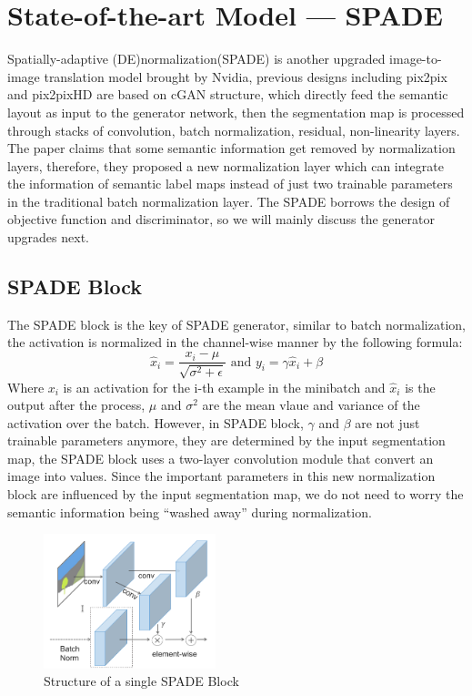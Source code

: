 \section{State-of-the-art Model — SPADE}
Spatially-adaptive (DE)normalization(SPADE)\cite{park2019SPADE} is another upgraded image-to-image 
translation model brought by Nvidia, previous designs including pix2pix \cite{pix2pix2016} and 
pix2pixHD \cite{wang2018pix2pixHD} are based on cGAN structure, which directly feed the semantic 
layout as input to the generator network, then the segmentation map is processed through stacks 
of convolution, batch normalization, residual, non-linearity layers. The paper claims that 
some semantic information get removed by normalization layers, therefore, they proposed a new 
normalization layer which can integrate the information of semantic label maps instead of just 
two trainable parameters in the traditional batch normalization layer. The SPADE borrows the design 
of objective function and discriminator, so we will mainly discuss the generator upgrades next. 
\subsection{SPADE Block}
The SPADE block is the key of SPADE generator, similar to batch normalization, the activation is 
normalized in the channel-wise manner by the following formula:
$$\hat{x}_{i}=\frac{x_{i}-\mu}{\sqrt{\sigma^{2}+\epsilon}} \text { and } y_{i}=\gamma \hat{x}_{i}+\beta$$
Where $x_{i}$ is an activation for the i-th example in the minibatch and $\hat{x}_{i}$ is the output after 
the process, $\mu$ and $\sigma^{2}$ are the mean vlaue and variance of the activation over the batch.
However, in SPADE block, $\gamma$ and $\beta$ are not just 
trainable parameters anymore, they are determined by the input segmentation map, the SPADE block uses
a two-layer convolution module that convert an image into values. Since the important parameters in
this new normalization block are influenced by the input segmentation map, we do not need to worry 
the semantic information being “washed away” during normalization.
\begin{figure}[H]
    \begin{center}
    \includegraphics[width=5cm]{figures/SPADE-Block}
    \end{center}
    \caption{Structure of a single SPADE Block}
    \label{fig:SPADE-Block}
\end{figure}

